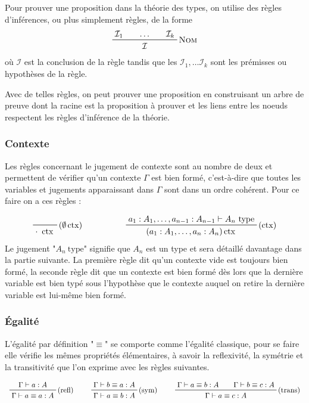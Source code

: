 \documentclass[../../rapport.tex]{subfiles}
\begin{document}
  Pour prouver une proposition dans la théorie des types, on utilise des règles d'inférences, ou plus simplement règles, de la forme
  $$
  \prfinterspace=2em
  \prftree[r]{\textsc{Nom}}{\mathcal I_1}{\hdots}{\mathcal I_k}{\mathcal I}
  $$
  où $\mathcal I$ est la conclusion de la règle tandis que les $\mathcal I_1, \hdots \mathcal I_k$
  sont les prémisses ou hypothèses de la règle.

  Avec de telles règles, on peut prouver une proposition en construisant un arbre de preuve
  dont la racine est la proposition à prouver et les liens entre les noeuds respectent les règles d'inférence de la théorie.

  \subsubsection{Contexte}

  Les règles concernant le jugement de contexte sont au nombre de deux et permettent de vérifier qu'un contexte $\Gamma$ est bien formé,
  c'est-à-dire que toutes les variables et jugements apparaissant dans $\Gamma$ sont dans un ordre cohérent.
  Pour ce faire on a ces règles :

  $$
  \begin{array}{cc}
    \prfbyaxiom{($\emptyset\ctx$)}{\cdot\ \ctx} \hspace{1.5cm}
    & \prftree[r]{($\ctx$)}{a_1 : A_1, \hdots, a_{n-1} : A_{n-1} \vdash A_n\ \text{type}}
      {(a_1 : A_1, \hdots, a_n : A_n) \ctx}
  \end{array}
  $$
  Le jugement "$A_n\ \text{type}$" signifie que $A_n$ est un type et sera détaillé davantage dans la partie suivante.
  La première règle dit qu'un contexte vide est toujours bien formé, la seconde règle dit que un contexte est bien formé
  dès lors que la dernière variable est bien typé sous l'hypothèse que le contexte auquel on retire la dernière variable
  est lui-même bien formé.

  \subsubsection{Égalité}

  L'égalité par définition "$\equiv$" se comporte comme l'égalité classique, pour se faire elle vérifie les mêmes propriétés élémentaires,
  à savoir la reflexivité, la symétrie et la transitivité que l'on exprime avec les règles suivantes.

  $$
  \prfinterspace=2em
  \begin{array}{ccc}
    \prftree[r]{(refl)}{\Gamma \vdash a : A}{\Gamma \vdash a \equiv a : A} \hspace{0.5cm}
    & \prftree[r]{(sym)} {\Gamma \vdash b \equiv a : A}{\Gamma \vdash a \equiv b : A} \hspace{0.5cm}
    & \prftree[r]{(trans)}{\Gamma \vdash a \equiv b : A}{\Gamma \vdash b \equiv c : A}{\Gamma \vdash a \equiv c : A}
  \end{array}
  $$
\end{document}
